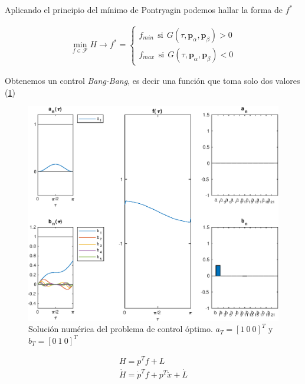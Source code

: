 Aplicando el principio del mínimo de Pontryagin podemos hallar la forma de $f^*$ 

\begin{gather}
    \min_{f \in \mathcal{F}} H \rightarrow f^* = \begin{cases}
        f_{min} \ \  \text{si} \ \ G(\tau,\bm{p}_\alpha,\bm{p}_\beta) > 0  \\
        f_{max} \ \ \text{si}  \ \ G(\tau,\bm{p}_\alpha,\bm{p}_\beta) < 0  
    \end{cases}
\end{gather}

Obtenemos un control \emph{Bang-Bang}, es decir una función que toma solo dos valores (\ref{figbang})



\begin{figure}[]
    \centering
    \includegraphics[scale=0.7]{fig/img03.eps}
    \caption{Solución numérica del problema de control óptimo. $a_T = [1 \ 0 \ 0]^T$ y 
    $b_T = [0 \ 1 \ 0]^T$}
    \label{figbang}
\end{figure}


\begin{gather}
    H = p^T f+ L \\
    \dot{H} = \dot{p}^T f + p^T \ddot{x} + \dot{L}
\end{gather}